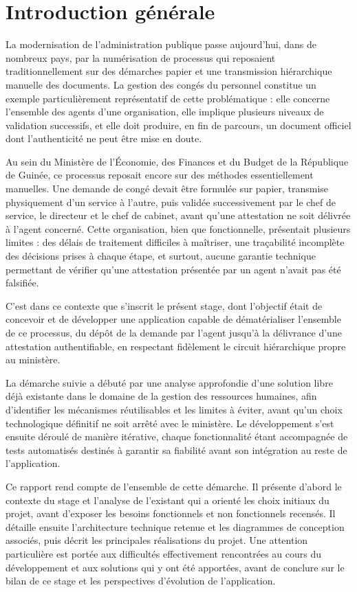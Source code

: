 \chapter*{Introduction générale}

La modernisation de l'administration publique passe aujourd'hui, dans de nombreux pays, par la numérisation de processus qui reposaient traditionnellement sur des démarches papier et une transmission hiérarchique manuelle des documents. La gestion des congés du personnel constitue un exemple particulièrement représentatif de cette problématique : elle concerne l'ensemble des agents d'une organisation, elle implique plusieurs niveaux de validation successifs, et elle doit produire, en fin de parcours, un document officiel dont l'authenticité ne peut être mise en doute.

Au sein du Ministère de l'Économie, des Finances et du Budget de la République de Guinée, ce processus reposait encore sur des méthodes essentiellement manuelles. Une demande de congé devait être formulée sur papier, transmise physiquement d'un service à l'autre, puis validée successivement par le chef de service, le directeur et le chef de cabinet, avant qu'une attestation ne soit délivrée à l'agent concerné. Cette organisation, bien que fonctionnelle, présentait plusieurs limites : des délais de traitement difficiles à maîtriser, une traçabilité incomplète des décisions prises à chaque étape, et surtout, aucune garantie technique permettant de vérifier qu'une attestation présentée par un agent n'avait pas été falsifiée.

C'est dans ce contexte que s'inscrit le présent stage, dont l'objectif était de concevoir et de développer une application capable de dématérialiser l'ensemble de ce processus, du dépôt de la demande par l'agent jusqu'à la délivrance d'une attestation authentifiable, en respectant fidèlement le circuit hiérarchique propre au ministère.

La démarche suivie a débuté par une analyse approfondie d'une solution libre déjà existante dans le domaine de la gestion des ressources humaines, afin d'identifier les mécanismes réutilisables et les limites à éviter, avant qu'un choix technologique définitif ne soit arrêté avec le ministère. Le développement s'est ensuite déroulé de manière itérative, chaque fonctionnalité étant accompagnée de tests automatisés destinés à garantir sa fiabilité avant son intégration au reste de l'application.

Ce rapport rend compte de l'ensemble de cette démarche. Il présente d'abord le contexte du stage et l'analyse de l'existant qui a orienté les choix initiaux du projet, avant d'exposer les besoins fonctionnels et non fonctionnels recensés. Il détaille ensuite l'architecture technique retenue et les diagrammes de conception associés, puis décrit les principales réalisations du projet. Une attention particulière est portée aux difficultés effectivement rencontrées au cours du développement et aux solutions qui y ont été apportées, avant de conclure sur le bilan de ce stage et les perspectives d'évolution de l'application.
